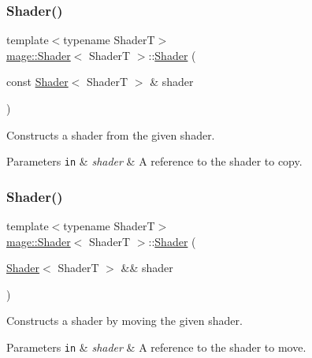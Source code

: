 \subsubsection{\texorpdfstring{Shader()}{Shader()}\hspace{0.1cm}{\footnotesize\ttfamily [3/4]}}
{\footnotesize\ttfamily template$<$typename ShaderT$>$ \\
\hyperlink{classmage_1_1_shader}{mage\+::\+Shader}$<$ ShaderT $>$\+::\hyperlink{classmage_1_1_shader}{Shader} (\begin{DoxyParamCaption}\item[{const \hyperlink{classmage_1_1_shader}{Shader}$<$ ShaderT $>$ \&}]{shader }\end{DoxyParamCaption})\hspace{0.3cm}{\ttfamily [delete]}}

Constructs a shader from the given shader.


\begin{DoxyParams}[1]{Parameters}
\mbox{\tt in}  & {\em shader} & A reference to the shader to copy. \\
\hline
\end{DoxyParams}
\hypertarget{classmage_1_1_shader_a15efa0daf4f65792ada9195ef1694766}{}\label{classmage_1_1_shader_a15efa0daf4f65792ada9195ef1694766} 
\subsubsection{\texorpdfstring{Shader()}{Shader()}\hspace{0.1cm}{\footnotesize\ttfamily [4/4]}}
{\footnotesize\ttfamily template$<$typename ShaderT$>$ \\
\hyperlink{classmage_1_1_shader}{mage\+::\+Shader}$<$ ShaderT $>$\+::\hyperlink{classmage_1_1_shader}{Shader} (\begin{DoxyParamCaption}\item[{\hyperlink{classmage_1_1_shader}{Shader}$<$ ShaderT $>$ \&\&}]{shader }\end{DoxyParamCaption})}

Constructs a shader by moving the given shader.


\begin{DoxyParams}[1]{Parameters}
\mbox{\tt in}  & {\em shader} & A reference to the shader to move. \\
\hline
\end{DoxyParams}
\hypertarget{classmage_1_1_shader_a0829beb106fdea24cc35832472951cce}{}\label{classmage_1_1_shader_a0829beb106fdea24cc35832472951cce} 
